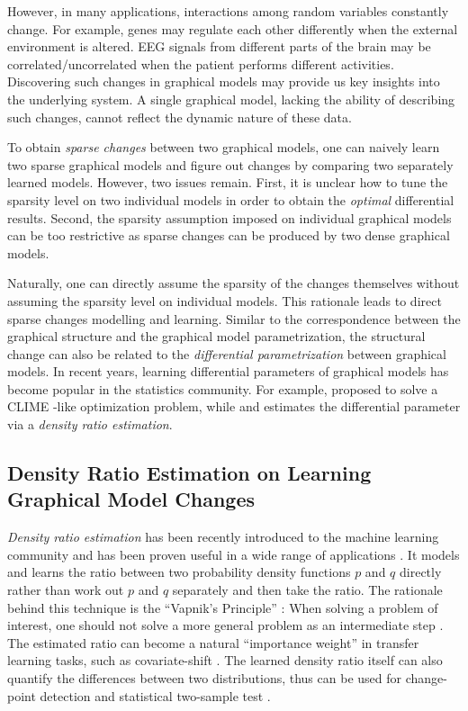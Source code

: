\documentclass[11pt]{article}
\numberwithin{equation}{section}
\numberwithin{theorem}{section}
\theoremstyle{definition}
\theoremstyle{remark}
\begin{document}
However, in many applications, interactions among random variables constantly change. For example, genes may regulate each other differently when the external environment is altered. EEG signals from different parts of the brain may be correlated/uncorrelated when the patient performs different activities.
Discovering such changes in graphical models may provide us key insights into the underlying system. A single graphical model, lacking the ability of describing such changes, cannot reflect the dynamic nature of these data.

To obtain \emph{sparse changes} between two graphical models, one can naively learn two sparse graphical models and figure out changes by comparing two separately learned models. However, two issues remain. First, it is unclear how to tune the sparsity level on two individual models in order to obtain the \emph{optimal }differential results. Second, the sparsity assumption imposed on individual graphical models can be too restrictive as sparse changes can be produced by two dense graphical models.

Naturally, one can directly assume the sparsity of the changes themselves without assuming the sparsity level on individual models. This rationale leads to direct sparse changes modelling and learning. Similar to the correspondence between the graphical structure and the graphical model parametrization, the structural change can also be related to the \emph{differential parametrization} between graphical models. In recent years, learning differential parameters of graphical models has become popular in the statistics community. For example, \cite{Zhao2014Direct} proposed to solve a CLIME \cite{Cai2011Constrained}-like optimization problem, while \cite{Liu2016a} and \cite{Fazayeli2016Generalized} estimates the differential parameter via a \emph{density ratio estimation}. 

\subsection{Density Ratio Estimation on Learning Graphical Model Changes}
\emph{Density ratio estimation} has been recently introduced to the machine learning community and has been proven useful in a wide range of applications \cite{Sugiyama2012}. It models and learns the ratio between two probability density functions $p$ and $q$ directly rather than work out $p$ and $q$ separately and then take the ratio. The rationale behind this technique is the ``Vapnik's Principle'' : When solving a problem of interest,	one should not solve a more general problem as an intermediate step \cite{Vapnik1998}. The estimated ratio can become a natural ``importance weight'' in transfer learning tasks, such as covariate-shift \cite{Shimodaira2000,Sugiyama2007covariate}. The learned density ratio itself can also quantify the differences between two distributions, thus can be used for change-point detection \cite{Liu2013} and statistical two-sample test \cite{Sugiyama2011}.
\end{document}
